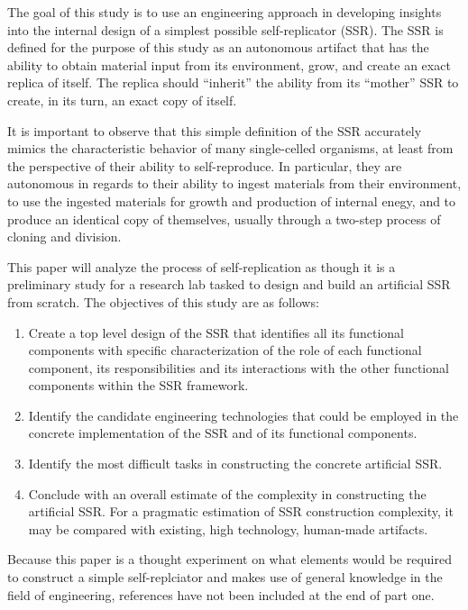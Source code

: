The goal of this study is to use an engineering approach in developing
insights into the internal design of a simplest possible self-replicator (SSR). 
The SSR is defined for the purpose of this study as
an autonomous artifact that has the ability to obtain material input from
its environment, grow, and create an exact replica of itself. The
replica should ``inherit'' the ability from its ``mother'' SSR to create,
in its turn, an exact copy of itself.

It is important to observe that this simple definition of the SSR accurately mimics the characteristic behavior of many single-celled organisms, at least from the perspective of their ability to self-reproduce. In particular, they are autonomous in regards to their ability to ingest materials from their environment, to use the ingested materials for growth and production of internal enegy, and to produce an identical copy of themselves, usually through a two-step process of cloning and division. 

This paper will analyze the process of self-replication as though it is a preliminary study for a research lab tasked to design and build an artificial SSR from scratch. The objectives of this study are as follows:

\begin{enumerate}
\item  Create a top level design of the SSR that identifies all its
functional components with specific characterization of the role of
each functional component, its responsibilities and its interactions
with the other functional components within the SSR framework.
\item  Identify the candidate engineering technologies that could be employed in
the concrete implementation of the SSR and of its functional
components.
\item  Identify the most difficult tasks in constructing the
concrete artificial SSR.
\item  Conclude with an overall estimate of the complexity 
in constructing
the artificial SSR. For a pragmatic estimation of
SSR construction complexity, it may be compared with 
existing, high technology, human-made artifacts.
\end{enumerate}

Because this paper is a thought experiment on what elements would be required to construct a simple self-replciator and makes use of general knowledge in the field of engineering, references have not been included at the end of part one.

